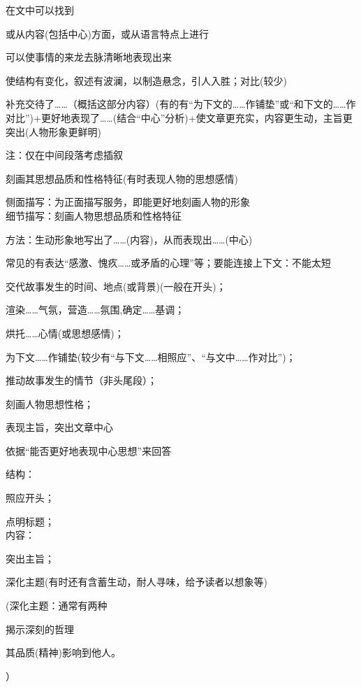 {
在文中可以找到

或从内容(包括中心)方面，或从语言特点上进行

可以使事情的来龙去脉清晰地表现出来

使结构有变化，叙述有波澜，以制造悬念，引人入胜；对比(较少)

补充交待了\ldots{}\ldots{}（概括这部分内容）(有的有``为下文的\ldots{}\ldots{}作铺垫''或``和下文的\ldots{}\ldots{}作对比'')+更好地表现了\ldots{}\ldots{}(结合``中心''分析)+使文章更充实，内容更生动，主旨更突出(人物形象更鲜明)\par
注：仅在中间段落考虑插叙

刻画其思想品质和性格特征(有时表现人物的思想感情)\par
侧面描写：为正面描写服务，即能更好地刻画人物的形象\\
细节描写：刻画人物思想品质和性格特征\par
方法：生动形象地写出了\ldots{}\ldots{}(内容)，从而表现出\ldots{}\ldots{}(中心)

常见的有表达``感激、愧疚\ldots{}\ldots{}或矛盾的心理''等；要能连接上下文：不能太短

\begin{asparaenum}[(1)]
\item 交代故事发生的时间、地点(或背景)(一般在开头)；
\item 渲染\ldots{}\ldots{}气氛，营造\ldots{}\ldots{}氛围,确定\ldots{}\ldots{}基调；
\item 烘托\ldots{}\ldots{}心情(或思想感情)；
\item 为下文\ldots{}\ldots{}作铺垫(较少有``与下文\ldots{}\ldots{}相照应''、``与文中\ldots{}\ldots{}作对比'')；
\item 推动故事发生的情节（非头尾段）；
\item 刻画人物思想性格；
\item 表现主旨，突出文章中心
\end{asparaenum}

依据``能否更好地表现中心思想''来回答

结构：\begin{asparaenum}[(1)]\item 照应开头；
        \item 点明标题；\\
内容：\item 突出主旨；
        \item 深化主题(有时还有含蓄生动，耐人寻味，给予读者以想象等)\end{asparaenum}
        (深化主题：通常有两种\begin{inparaenum}[(1)]\item 揭示深刻的哲理\item 其品质(精神)影响到他人。\end{inparaenum}）

}
